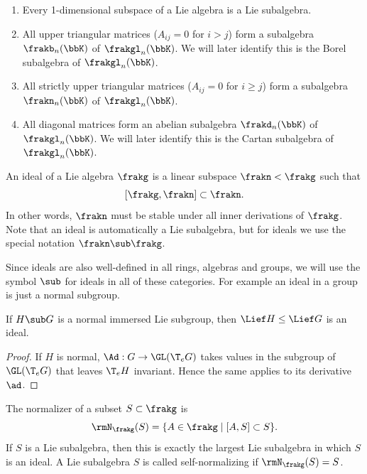 \begin{example}
    \begin{enumerate}
        \item Every 1-dimensional subspace of a Lie algebra is a Lie subalgebra.
        \item All upper triangular matrices ($A_{ij}=0$ for $i>j$) form a subalgebra $\frakb_n(\bbK)$ of $\frakgl_n(\bbK)$. We will later identify this is the Borel subalgebra of $\frakgl_n(\bbK)$.
        \item All strictly upper triangular matrices ($A_{ij}=0$ for $i\geq j$) form a subalgebra $\frakn_n(\bbK)$ of $\frakgl_n(\bbK)$.
        \item All diagonal matrices form an abelian subalgebra $\frakd_n(\bbK)$ of $\frakgl_n(\bbK)$. We will later identify this is the Cartan subalgebra of $\frakgl_n(\bbK)$.
    \end{enumerate}
\end{example}



\begin{defn}[Ideal]
    An ideal of a Lie algebra $\frakg$ is a linear subspace $\frakn<\frakg$ such that
    \[[\frakg,\frakn]\subset \frakn.\]
    In other words, $\frakn$ must be stable under all inner derivations of $\frakg$. Note that an ideal is automatically a Lie subalgebra, but for ideals we use the special notation $\frakn\sub \frakg$.\index{$\sub$}
\end{defn}

Since ideals are also well-defined in all rings, algebras and groups, we will use the symbol $\sub$ for ideals in all of these categories. For example an ideal in a group is just a normal subgroup.

\begin{prop}
    If $H\sub G$ is a normal immersed Lie subgroup, then $\Lief H\leq \Lief G$ is an ideal.
\end{prop}
\begin{proof}
    If $H$ is normal, $\Ad:G\to \GL(\T_eG)$ takes values in the subgroup of $\GL(\T_eG)$ that leaves $\T_e H$ invariant. Hence the same applies to its derivative $\ad$.
\end{proof}

\begin{defn}
    The normalizer of a subset $S\subset \frakg$ is
    \[\rmN_\frakg(S)=\{A\in\frakg\mid [A,S]\subset S\}.\]
    If $S$ is a Lie subalgebra, then this is exactly the largest Lie subalgebra in which $S$ is an ideal. A Lie subalgebra $S$ is called self-normalizing if $\rmN_\frakg(S)=S$.
\end{defn}

